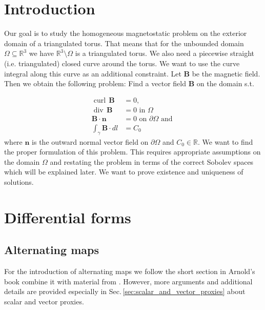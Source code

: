 \documentclass[12pt,a4paper]{article}
\numberwithin{equation}{subsection}
\numberwithin{lemma}{subsection}
\theoremstyle{definition}
\DeclareMathOperator{\curl}{curl}
\DeclareMathOperator{\diver}{div}
\newcommand{\real}{\mathbb{R}}
\begin{document}
\section{Introduction}
Our goal is to study the homogeneous magnetostatic problem on the exterior 
domain of a triangulated torus. That means 
that for the unbounded domain  $\Omega \subseteq \real^3$ we have
$\real^3 \setminus \Omega$ is a triangulated torus. We also need a 
piecewise straight (i.e. triangulated) closed curve around the torus.
We want to use the curve integral along this curve as an additional 
constraint.
Let $\mathbf{B}$ be the magnetic field. Then we obtain the following problem:
Find a vector field $\mathbf{B}$ on the domain s.t.

\begin{align}
    \curl \, \mathbf{B} &= 0, \\ 
    \diver \, \mathbf{B}  &= 0 \text{ in } \Omega \\
    \mathbf{B} \cdot \mathbf{n} &= 0 \text{ on } \partial \Omega \text{ and }\\
    \int_\gamma \mathbf{B} \cdot dl &= C_0
\end{align}
where $\mathbf{n}$ is the outward normal vector field on $\partial \Omega$ and 
$C_0 \in \real$. 
We want to find the proper formulation of this problem. This requires 
appropriate assumptions on the domain $\Omega$ and restating the problem
in terms of the correct Sobolev spaces which will be explained later.
We want to prove existence and uniqueness of 
solutions. 

\section{Differential forms}


\subsection{Alternating maps} \label{sec:alternating_maps}

For the introduction of alternating maps we follow
the short section in Arnold's book
\cite[Sec. 6.1.]{arnold} combine it 
with material from \cite[Sec.\,V.1]{topology_and_geometry}.
However, more arguments and additional details are provided especially  
in Sec.\,\ref{sec:scalar_and_vector_proxies} about scalar and vector proxies.
\end{document}
